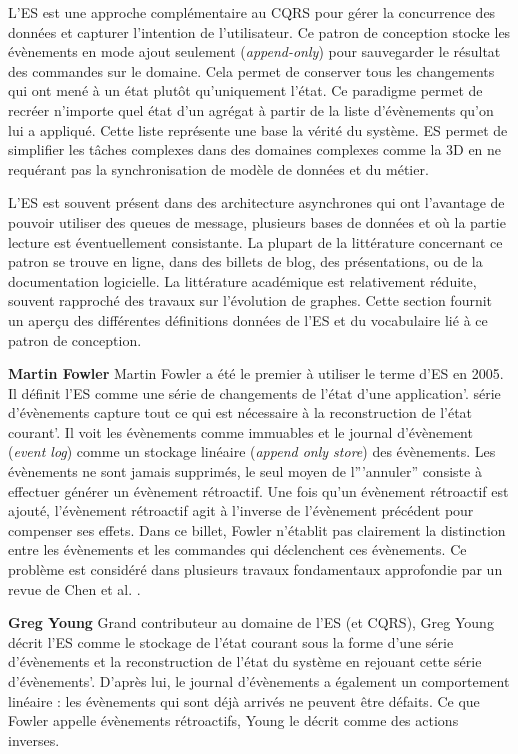 L'\gls{ES} est une approche complémentaire au \gls{CQRS} pour 
gérer la 
concurrence des données et capturer l'intention de l'utilisateur. Ce patron de 
conception stocke les évènements en mode ajout seulement 
(\textit{append-only}) pour sauvegarder le résultat des commandes sur le 
domaine. Cela permet de conserver tous les changements qui ont mené à un 
état plutôt qu'uniquement l'état. Ce paradigme permet de recréer n'importe quel 
état d'un agrégat à partir de la liste d'évènements qu'on lui a appliqué. Cette 
liste représente une base la vérité du système. 
\gls{ES} permet de simplifier les tâches complexes dans des 
domaines complexes comme la 3D en ne requérant pas la synchronisation de 
modèle de données et du métier. 

L'\gls{ES} est souvent présent dans des architecture asynchrones qui ont 
l'avantage de pouvoir utiliser des queues de message, plusieurs bases de 
données et où la partie lecture est éventuellement consistante.
La plupart de la littérature concernant ce patron se trouve en ligne, dans des 
billets de blog, des présentations, ou de la documentation logicielle. La 
littérature académique est relativement réduite, souvent rapproché des travaux 
sur l'évolution de graphes. Cette section fournit un aperçu des différentes 
définitions données de l'\gls{ES} et du vocabulaire lié à ce patron de conception.

\textbf{Martin Fowler} Martin Fowler a été le premier à utiliser le terme 
d'\acrlong{ES} en 2005. Il définit l'\gls{ES} comme \og une série de 
changements 
de l'état d'une application\fg{}'.  \og série d'évènements capture tout ce qui est 
nécessaire à la reconstruction de l'état courant'\fg{}. Il voit les évènements 
comme 
immuables et le journal d'évènement (\textit{event log}) comme un stockage 
linéaire (\textit{append only store}) des évènements. Les évènements ne sont 
jamais supprimés, le seul moyen de l'''annuler'' consiste à effectuer générer un 
évènement rétroactif. Une fois qu'un évènement rétroactif est ajouté, 
l'évènement 
rétroactif agit à l'inverse de l'évènement précédent pour compenser ses effets. 
Dans ce billet, Fowler n'établit pas clairement la distinction entre les 
évènements 
et les commandes qui déclenchent ces évènements. Ce problème est 
considéré dans plusieurs travaux fondamentaux \cite{Prakash1994,Sun2002,Weiss2009a,Weiss2010} approfondie par un revue de Chen et al. \cite{Cheng2013}.

\textbf{Greg Young} Grand contributeur au domaine de l'\gls{ES} (et \gls{CQRS}), Greg 
Young décrit l'\gls{ES} comme \og le stockage de l'état courant sous la forme 
d'une série d'évènements et la reconstruction de l'état du système en rejouant 
cette série d'évènements'\fg{}. D'après lui, le journal d'évènements a également 
un comportement linéaire : les évènements qui sont déjà arrivés ne peuvent 
être défaits. Ce que Fowler appelle évènements rétroactifs, Young le décrit 
comme des actions inverses.

